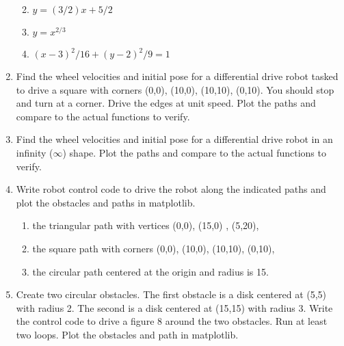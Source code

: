 \begin{enumerate}
  \begin{enumerate}
  \def\labelenumii{\alph{enumii}.}
  \tightlist
  \item
    \(y=(3/2)x + 5/2\)
  \item
    \(y = x^{2/3}\)
  \item
    \((x-3)^2/16 + (y-2)^2/9 = 1\)
  \end{enumerate}
\item
  Find the wheel velocities and initial pose for a differential drive
  robot tasked to drive a square with corners (0,0), (10,0), (10,10),
  (0,10). You should stop and turn at a corner. Drive the edges at unit
  speed. Plot the paths and compare to the actual functions to verify.
\item
  Find the wheel velocities and initial pose for a differential drive
  robot in an infinity (\(\infty\)) shape. Plot the paths and compare to
  the actual functions to verify.
\item
  Write robot control code to drive the robot along the indicated paths
  and plot the obstacles and paths in matplotlib.

  \begin{enumerate}
  \def\labelenumii{\alph{enumii}.}
  \tightlist
  \item
    the triangular path with vertices (0,0), (15,0) , (5,20),
  \item
    the square path with corners (0,0), (10,0), (10,10), (0,10),
  \item
    the circular path centered at the origin and radius is 15.
  \end{enumerate}
\item
  Create two circular obstacles. The first obstacle is a disk centered
  at (5,5) with radius 2. The second is a disk centered at (15,15) with
  radius 3. Write the control code to drive a figure 8 around the two
  obstacles. Run at least two loops. Plot the obstacles and path in
  matplotlib.
\end{enumerate}
